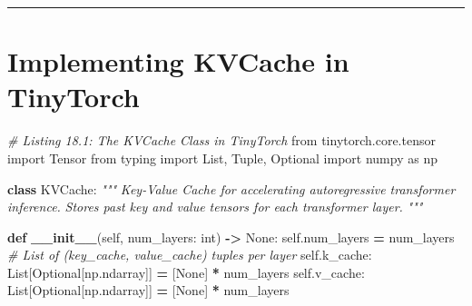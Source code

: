 \documentclass[
  letterpaper,
]{scrbook}
\newenvironment{Shaded}{\begin{snugshade}}{\end{snugshade}}
\newcommand{\BuiltInTok}[1]{#1}
\newcommand{\CommentTok}[1]{\textcolor[rgb]{0.56,0.35,0.01}{\textit{#1}}}
\newcommand{\FunctionTok}[1]{\textcolor[rgb]{0.13,0.29,0.53}{\textbf{#1}}}
\newcommand{\ImportTok}[1]{#1}
\newcommand{\KeywordTok}[1]{\textcolor[rgb]{0.13,0.29,0.53}{\textbf{#1}}}
\newcommand{\NormalTok}[1]{#1}
\newcommand{\OperatorTok}[1]{\textcolor[rgb]{0.81,0.36,0.00}{\textbf{#1}}}
\newcommand{\VariableTok}[1]{\textcolor[rgb]{0.00,0.00,0.00}{#1}}
\begin{document}
\begin{center}\rule{0.5\linewidth}{0.5pt}\end{center}

\section{Implementing KVCache in
TinyTorch}\label{implementing-kvcache-in-tinytorch}

\begin{Shaded}
\begin{Highlighting}[]
\CommentTok{\# Listing 18.1: The KVCache Class in TinyTorch}
\ImportTok{from}\NormalTok{ tinytorch.core.tensor }\ImportTok{import}\NormalTok{ Tensor}
\ImportTok{from}\NormalTok{ typing }\ImportTok{import}\NormalTok{ List, Tuple, Optional}
\ImportTok{import}\NormalTok{ numpy }\ImportTok{as}\NormalTok{ np}

\KeywordTok{class}\NormalTok{ KVCache:}
    \CommentTok{"""}
\CommentTok{    Key{-}Value Cache for accelerating autoregressive transformer inference.}
\CommentTok{    Stores past key and value tensors for each transformer layer.}
\CommentTok{    """}

    \KeywordTok{def} \FunctionTok{\_\_init\_\_}\NormalTok{(}\VariableTok{self}\NormalTok{, num\_layers: }\BuiltInTok{int}\NormalTok{) }\OperatorTok{{-}\textgreater{}} \VariableTok{None}\NormalTok{:}
        \VariableTok{self}\NormalTok{.num\_layers }\OperatorTok{=}\NormalTok{ num\_layers}
        \CommentTok{\# List of (key\_cache, value\_cache) tuples per layer}
        \VariableTok{self}\NormalTok{.k\_cache: List[Optional[np.ndarray]] }\OperatorTok{=}\NormalTok{ [}\VariableTok{None}\NormalTok{] }\OperatorTok{*}\NormalTok{ num\_layers}
        \VariableTok{self}\NormalTok{.v\_cache: List[Optional[np.ndarray]] }\OperatorTok{=}\NormalTok{ [}\VariableTok{None}\NormalTok{] }\OperatorTok{*}\NormalTok{ num\_layers}


\end{Highlighting}
\end{Shaded}
\end{document}
